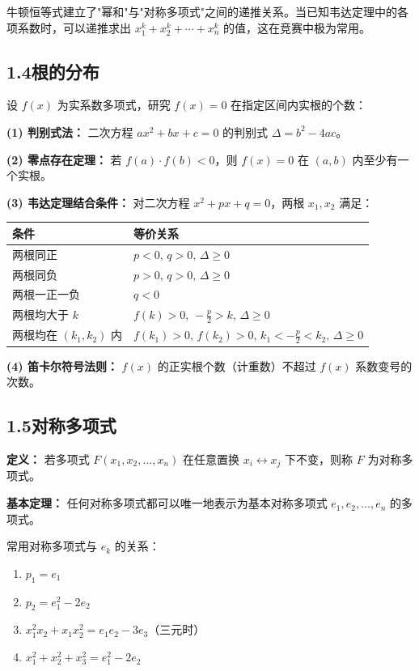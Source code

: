 \documentclass[12pt, a4paper]{ctexart}
\begin{document}
\begin{tipbox}[牛顿恒等式的作用]
牛顿恒等式建立了"幂和"与"对称多项式"之间的递推关系。当已知韦达定理中的各项系数时，可以递推求出 $x_1^k + x_2^k + \cdots + x_n^k$ 的值，这在竞赛中极为常用。
\end{tipbox}

\subsection*{1.4\quad 根的分布}

\begin{knowledgebox}[实系数多项式实根分布的基本方法]
设 $f(x)$ 为实系数多项式，研究 $f(x)=0$ 在指定区间内实根的个数：

\textbf{(1) 判别式法：} 二次方程 $ax^2+bx+c=0$ 的判别式 $\Delta = b^2-4ac$。

\textbf{(2) 零点存在定理：} 若 $f(a) \cdot f(b) < 0$，则 $f(x)=0$ 在 $(a,b)$ 内至少有一个实根。

\textbf{(3) 韦达定理结合条件：} 对二次方程 $x^2+px+q=0$，两根 $x_1, x_2$ 满足：

\begin{center}
\begin{tabular}{l|l}
\toprule
条件 & 等价关系 \\
\midrule
两根同正 & $p<0,\, q>0,\, \Delta \geq 0$ \\
两根同负 & $p>0,\, q>0,\, \Delta \geq 0$ \\
两根一正一负 & $q<0$ \\
两根均大于 $k$ & $f(k)>0,\, -\frac{p}{2}>k,\, \Delta \geq 0$ \\
两根均在 $(k_1,k_2)$ 内 & $f(k_1)>0,\, f(k_2)>0,\, k_1<-\frac{p}{2}<k_2,\, \Delta \geq 0$ \\
\bottomrule
\end{tabular}
\end{center}

\textbf{(4) 笛卡尔符号法则：} $f(x)$ 的正实根个数（计重数）不超过 $f(x)$ 系数变号的次数。
\end{knowledgebox}

\subsection*{1.5\quad 对称多项式}

\begin{knowledgebox}[对称多项式基本定理]
\textbf{定义：} 若多项式 $F(x_1, x_2, \ldots, x_n)$ 在任意置换 $x_i \leftrightarrow x_j$ 下不变，则称 $F$ 为对称多项式。

\textbf{基本定理：} 任何对称多项式都可以唯一地表示为基本对称多项式 $e_1, e_2, \ldots, e_n$ 的多项式。

常用对称多项式与 $e_k$ 的关系：
\begin{enumerate}[label=(\arabic*)]
\item $p_1 = e_1$
\item $p_2 = e_1^2 - 2e_2$
\item $x_1^2 x_2 + x_1 x_2^2 = e_1 e_2 - 3e_3$（三元时）
\item $x_1^2 + x_2^2 + x_3^2 = e_1^2 - 2e_2$
\end{enumerate}
\end{knowledgebox}
\end{document}
